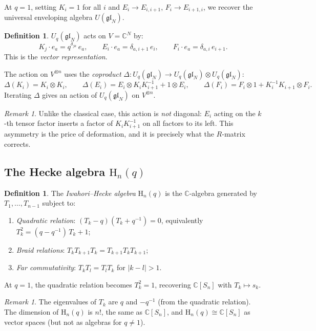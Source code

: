 \documentclass[12pt,a4paper]{article}
\theoremstyle{definition}
\newtheorem{definition}[theorem]{Definition}
\theoremstyle{remark}
\newtheorem{remark}[theorem]{Remark}
\newcommand{\C}{\mathbb{C}}
\newcommand{\gl}{\mathfrak{gl}}
\begin{document}
At $q = 1$, setting $K_i = 1$ for all $i$ and
$E_i \to E_{i, i+1}$, $F_i \to E_{i+1, i}$, we recover the
universal enveloping algebra $U(\gl_N)$.

\begin{definition}
$U_q(\gl_N)$ acts on $V = \C^N$ by:
\[
  K_j \cdot e_a = q^{\delta_{ja}}\, e_a, \qquad
  E_i \cdot e_a = \delta_{a, i+1}\, e_i, \qquad
  F_i \cdot e_a = \delta_{a, i}\, e_{i+1}.
\]
This is the \emph{vector representation}.
\end{definition}

The action on $V^{\otimes n}$ uses the \emph{coproduct}
$\Delta : U_q(\gl_N) \to U_q(\gl_N) \otimes U_q(\gl_N)$:
\[
  \Delta(K_i) = K_i \otimes K_i, \qquad
  \Delta(E_i) = E_i \otimes K_i K_{i+1}^{-1} + 1 \otimes E_i,
  \qquad
  \Delta(F_i) = F_i \otimes 1 + K_i^{-1} K_{i+1} \otimes F_i.
\]
Iterating $\Delta$ gives an action of $U_q(\gl_N)$ on $V^{\otimes n}$.

\begin{remark}
Unlike the classical case, this action is \emph{not} diagonal: $E_i$
acting on the $k$-th tensor factor inserts a factor of
$K_i K_{i+1}^{-1}$ on all factors to its left. This asymmetry is the
price of deformation, and it is precisely what the $R$-matrix corrects.
\end{remark}

\subsection{The Hecke algebra $\mathrm{H}_n(q)$}

\begin{definition}
The \emph{Iwahori--Hecke algebra} $\mathrm{H}_n(q)$ is the $\C$-algebra
generated by $T_1, \ldots, T_{n-1}$ subject to:
\begin{enumerate}[label=(\roman*)]
\item \emph{Quadratic relation}: $(T_k - q)(T_k + q^{-1}) = 0$,
  equivalently $T_k^2 = (q - q^{-1})\, T_k + 1$;
\item \emph{Braid relations}: $T_k T_{k+1} T_k = T_{k+1} T_k T_{k+1}$;
\item \emph{Far commutativity}: $T_k T_l = T_l T_k$ for $|k - l| > 1$.
\end{enumerate}
\end{definition}

At $q = 1$, the quadratic relation becomes $T_k^2 = 1$, recovering
$\C[S_n]$ with $T_k \mapsto s_k$.

\begin{remark}
The eigenvalues of $T_k$ are $q$ and $-q^{-1}$ (from the quadratic
relation). The dimension of $\mathrm{H}_n(q)$ is $n!$, the same as
$\C[S_n]$, and $\mathrm{H}_n(q) \cong \C[S_n]$ as vector spaces (but
not as algebras for $q \neq 1$).
\end{remark}
\end{document}
